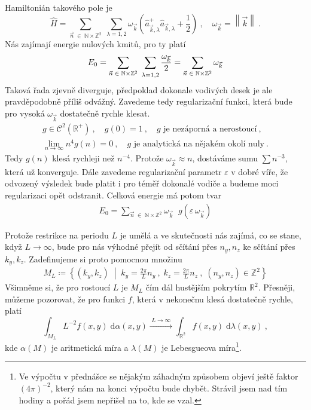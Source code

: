 \documentclass[10pt,a4paper]{article}
\def\vph{\vphantom}
\newcommand{\const}[1]{\text{#1}}
\newcommand{\norm}[1]{\left\lVert#1\right\rVert}
\renewcommand{\d}[1]{\;\const{d}#1}
\def\N{\mathbb{N}}
\def\Z{\mathbb{Z}}
\def\R{\mathbb{R}}
\begin{document}
Hamiltonián takového pole je
\begin{equation*}
    \hat H
    =
    \sum_{\vec n \; \in \; \N \times \Z^2} \;
    \sum_{\lambda = 1, 2}
    \omega_{\vec k}
    \left(
        \hat a_{\vec k, \lambda}^+
        \hat a_{\vec k, \lambda}
        + \frac{1}{2}
    \right)
    \: , \quad
    \omega_{\vec k} = \norm{\vec k}
    \: .
\end{equation*}
Nás zajímají energie nulových kmitů, pro ty platí
\begin{equation*}
    E_0 =
    \sum_{\vec n \; \in \; \N \times \Z^2} \;
    \sum_{\vph{\vec k} \lambda = 1, 2}
    \frac{\omega_{\vec k}}{2}
    =
    \sum_{\vec n \; \in \; \N \times \Z^2} \omega_{\vec k}
\end{equation*}
Taková řada zjevně diverguje, předpoklad dokonale vodivých desek je ale pravděpodobně příliš odvážný. Zavedeme tedy regularizační funkci, která bude pro vysoká $\omega_{\vec k}$ dostatečně rychle klesat.
\begin{gather*}
    g \in \mathcal{C}^2(\R^+)
    \: , \quad
    g(0) = 1
    \: , \quad
    g \text{ je nezáporná a nerostoucí}
    \: , \\
    \lim_{n \to \infty} n^4 g(n) = 0
    \: , \quad
    g \text{ je analytická na nějakém okolí nuly}
    \: .
\end{gather*}
Tedy $g(n)$ klesá rychleji než $n^{-4}$. Protože $\omega_{\vec k} \approx n$, dostáváme sumu $\sum n^{-3}$, která už konverguje. Dále zavedeme regularizační parametr $\varepsilon$ v dobré víře, že odvozený výsledek bude platit i pro téměř dokonalé vodiče a budeme moci regularizaci opět odstranit. Celková energie má potom tvar
\begin{gather*}
    E_0 =
    \sum_{\vec n \; \in \; \N \times \Z^2}
    \omega_{\vec k} \;\;
    g(\varepsilon \, \omega_{\vec k})
\end{gather*}

Protože restrikce na periodu $L$ je umělá a ve skutečnosti nás zajímá, co se stane, když $L \to \infty$, bude pro nás výhodné přejít od sčítání přes $n_y, n_z$ ke sčítání přes $k_y, k_z$. Zadefinujeme si proto pomocnou množinu
\begin{gather*}
    M_L \coloneqq \left\{
        (k_y, k_z)
        \; \middle| \;
        k_y = \frac{2\pi}{L} n_y
        \: , \;
        k_z = \frac{2\pi}{L} n_z
        \: , \;
        (n_y, n_z) \in \Z^2
    \right\}
\end{gather*}
Všimněme si, že pro rostoucí $L$ je $M_L$ čím dál hustějším pokrytím $\R^2$. Přesněji, můžeme pozorovat, že pro funkci $f$, která v nekonečnu klesá dostatečně rychle, platí
\begin{equation*}
    \int_{M_L} L^{-2} f(x, y) \d{\alpha}(x, y)
    \xrightarrow{\;L \to \infty\;}
    \int_{\R^2} f(x, y) \d{\lambda}(x, y)
    \: ,
\end{equation*}
kde $\alpha(M)$ je aritmetická míra a $\lambda(M)$ je Lebesgueova míra\footnote{\label{magicky-faktor}Ve výpočtu v přednášce se nějakým záhadným způsobem objeví ještě faktor $(4\pi)^{-2}$, který nám na konci výpočtu bude chybět. Strávil jsem nad tím hodiny a pořád jsem nepřišel na to, kde se vzal.}.
\end{document}
